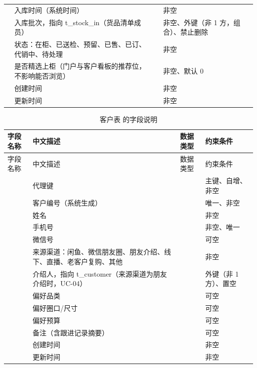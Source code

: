 \begin{longtable}{@{}L{3.5cm} L{4.1cm} L{2.9cm} L{4.0cm}@{}}
 & 入库时间（系统时间） &  & 非空 \\
 & 入库批次，指向 t\_stock\_in（货品清单成员） &  & 非空、外键（非 1 方，组合）、禁止删除 \\
 & 状态：在柜、已送检、预留、已售、已订、代销中、待处理 &  & 非空 \\
 & 是否精选上柜（门户与客户看板的推荐位，不影响能否浏览） &  & 非空、默认 0 \\
 & 创建时间 &  & 非空 \\
 & 更新时间 &  & 非空 \\
\end{longtable}

\begin{longtable}{@{}L{3.5cm} L{4.1cm} L{2.9cm} L{4.0cm}@{}}
\caption{客户表  的字段说明}\label{tab:f-t-customer}\\
\toprule
字段名称 & 中文描述 & 数据类型 & 约束条件 \\
\midrule
\endfirsthead
\toprule
字段名称 & 中文描述 & 数据类型 & 约束条件 \\
\midrule
\endhead
\bottomrule
\endlastfoot
{} & 代理键 &  & 主键、自增、非空 \\
 & 客户编号（系统生成） &  & 唯一、非空 \\
 & 姓名 &  & 非空 \\
 & 手机号 &  & 非空、唯一 \\
 & 微信号 &  & 可空 \\
 & 来源渠道：闲鱼、微信朋友圈、朋友介绍、线下、直播、老客户复购、其他 &  & 非空 \\
 & 介绍人，指向 t\_customer（来源渠道为朋友介绍时，UC-04） &  & 外键（非 1 方）、置空 \\
 & 偏好品类 &  & 可空 \\
 & 偏好圈口/尺寸 &  & 可空 \\
 & 偏好预算 &  & 可空 \\
 & 备注（含跟进记录摘要） &  & 可空 \\
 & 创建时间 &  & 非空 \\
 & 更新时间 &  & 非空 \\
\end{longtable}

